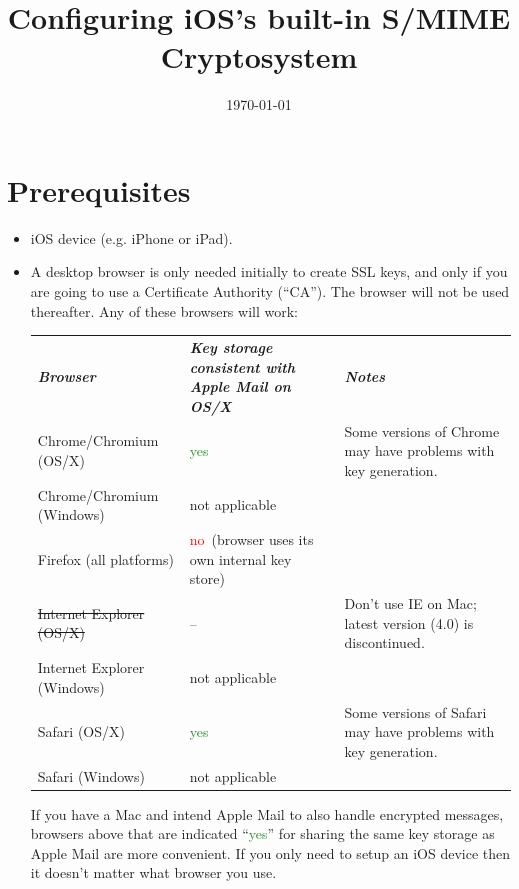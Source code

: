\documentclass[pdftex,12pt,titlepage=false]{scrartcl}
\title{\rmfamily Configuring iOS's built-in S/MIME Cryptosystem}
\date{\rmfamily\today}
\newcommand{\yesgood}{\textcolor{ForestGreen}{yes}}
\newcommand{\nobad}{\textcolor{red}{no}}
\newcommand{\keystoreintl}{\tiny(browser uses its own internal key store)}
\begin{document}
\maketitle

\tableofcontents

\section{Prerequisites}
\begin{itemize}
\item iOS device (e.g. iPhone or iPad).
\item A desktop browser is only needed initially to create SSL keys,
  and only if you are going to use a Certificate Authority (``CA'').
  The browser will not be used thereafter.  Any of these browsers will
  work:
  
    \begin{tabular}{lp{50mm}>{\small}p{}}
    \textsl{\textbf{Browser}}          & \textsl{\textbf{Key storage consistent with Apple Mail on OS/X}} & \textsl{\textbf{Notes}}\\
    Chrome/Chromium \tiny(OS/X)        & \yesgood                & Some versions of Chrome may have problems with key generation.\\
    \hline
    Chrome/Chromium \tiny(Windows)     & not applicable          & \\
    \hline
    Firefox \tiny(all platforms)       & \nobad\ \keystoreintl   & \\
    \hline
    \st{Internet Explorer \tiny(OS/X)} & --                      & Don't use IE on Mac; latest version (4.0) is discontinued.\\
    \hline
    Internet Explorer \tiny(Windows)   & not applicable          & \\
    \hline
    Safari \tiny(OS/X)                 & \yesgood                & Some versions of Safari may have problems with key generation.\\
    \hline
    Safari \tiny(Windows)              & not applicable          & \\
  \end{tabular}

  If you have a Mac and intend Apple Mail to also handle encrypted
  messages, browsers above that are indicated ``\yesgood'' for sharing
  the same key storage as Apple Mail are more convenient.  If you only
  need to setup an iOS device then it doesn't matter what browser you
  use.

\end{itemize}
\end{document}
